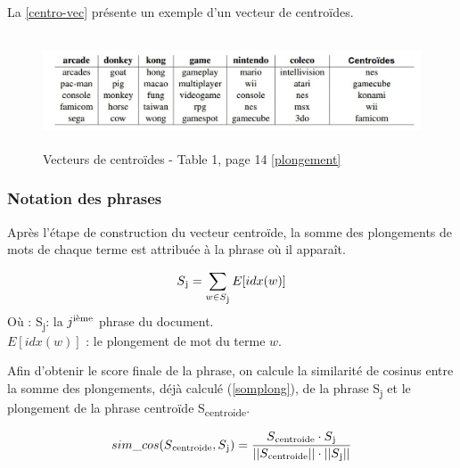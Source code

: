              \vspace*{0.5cm}
             La \autoref{centro-vec} présente un exemple d'un vecteur de centroïdes. 
              \begin{figure}[H]
                 \centering
                \includegraphics[height=95pt,width=420pt]{img/chapter3/centroideembed.jpg}
                \caption{Vecteurs de centroïdes - Table 1, page 14 \ref{plongement}}
                \label{centro-vec}
             \end{figure}
         \vspace*{1cm}    
         \subsubsection{Notation des phrases}
         Après l'étape de construction du vecteur centroïde, la somme des plongements de mots de chaque terme  est attribuée à la phrase où il apparaît.\label{somplong}

        \begin{equation*}
         S\textsubscript{j} = \sum_{\substack{w\in S\textsubscript{j}}}
         E[idx(w)]
        \end{equation*}
        Où :
        S\textsubscript{j}: la $j\textsuperscript{ième}$ phrase du document. \\ 
        $E[idx(w)]$ : le plongement de mot du terme $w$.

        Afin d'obtenir le score finale de la phrase, on calcule la similarité de cosinus entre la somme des plongements, déjà calculé (\ref{somplong}), de la phrase S\textsubscript{j} et le plongement de la phrase centroïde S\textsubscript{centroide}.
        
        \[sim\_cos(S\textsubscript{centroide},S\textsubscript{j}) = \frac {S\textsubscript{centroide} \cdot S\textsubscript{j}}{||S\textsubscript{centroide}|| \cdot ||S\textsubscript{j}||}\]

